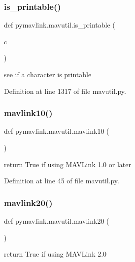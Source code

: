 \subsubsection{\texorpdfstring{is\_printable()}{is\_printable()}}
{\footnotesize\ttfamily def pymavlink.\+mavutil.\+is\+\_\+printable (\begin{DoxyParamCaption}\item[{}]{c }\end{DoxyParamCaption})}

\begin{DoxyVerb}see if a character is printable\end{DoxyVerb}
 

Definition at line 1317 of file mavutil.\+py.

\mbox{\label{namespacepymavlink_1_1mavutil_a7fd32207af170dbaf42dbd56905e6f38}} 
\subsubsection{\texorpdfstring{mavlink10()}{mavlink10()}}
{\footnotesize\ttfamily def pymavlink.\+mavutil.\+mavlink10 (\begin{DoxyParamCaption}{ }\end{DoxyParamCaption})}

\begin{DoxyVerb}return True if using MAVLink 1.0 or later\end{DoxyVerb}
 

Definition at line 45 of file mavutil.\+py.

\mbox{\label{namespacepymavlink_1_1mavutil_add838268f6c1da5cbdf2690e6f89c00d}} 
\subsubsection{\texorpdfstring{mavlink20()}{mavlink20()}}
{\footnotesize\ttfamily def pymavlink.\+mavutil.\+mavlink20 (\begin{DoxyParamCaption}{ }\end{DoxyParamCaption})}

\begin{DoxyVerb}return True if using MAVLink 2.0\end{DoxyVerb}
 

